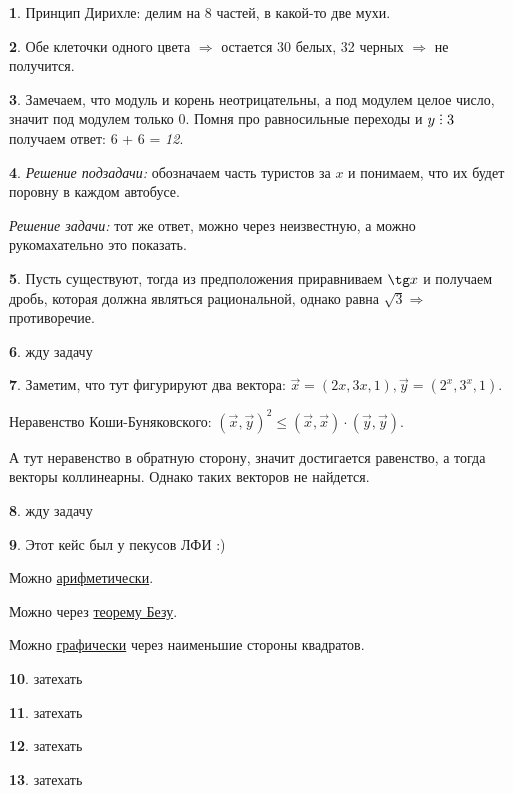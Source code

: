 \documentclass[14pt, a4paper]{extarticle}
\theoremstyle{definition}
\newtheorem{problem}{}
\theoremstyle{definition}
\theoremstyle{remark}
\numberwithin{equation}{section}
\DeclareRobustCommand{\divby}{%
  \mathrel{\text{\vbox{\baselineskip.65ex\lineskiplimit0pt\hbox{.}\hbox{.}\hbox{.}}}}%
}
\begin{document}
\begin{problem}
    Принцип Дирихле: делим на 8 частей, в какой-то две мухи.
\end{problem}

\begin{problem}
    Обе клеточки одного цвета $\Rightarrow$ остается 30 белых, 32 черных
    $\Rightarrow$ не получится.
\end{problem}

\begin{problem}
    Замечаем, что модуль и корень неотрицательны, а под модулем 
    целое число, значит под модулем только 0. Помня про равносильные
    переходы и $y \divby 3$ получаем ответ: 6 + 6 = \textit{12}.
\end{problem}

\begin{problem}
    \textit{Решение подзадачи:} обозначаем часть туристов за $x$ и понимаем,
    что их будет поровну в каждом автобусе.

    \textit{Решение задачи:} тот же ответ, можно через неизвестную,
    а можно рукомахательно это показать.
\end{problem}

\begin{problem}
    Пусть существуют, тогда из предположения приравниваем $\tg x$ и получаем
    дробь, которая должна являться рациональной, однако равна $\sqrt{3}
    \Rightarrow$ противоречие.
\end{problem}

\begin{problem}
    жду задачу
\end{problem}

\begin{problem}
    Заметим, что тут фигурируют два вектора: $\vec{x} = (2x, 3x, 1),
    \vec{y} = (2^x, 3^x, 1)$.

    Неравенство Коши-Буняковского: $(\vec{x}, \vec{y})^2 \leqslant
    (\vec{x}, \vec{x}) \cdot (\vec{y}, \vec{y})$.

    А тут неравенство в обратную сторону, значит достигается равенство,
    а тогда векторы коллинеарны. Однако таких векторов не найдется.
\end{problem}

\begin{problem}
    жду задачу
\end{problem}

\begin{problem}
    Этот кейс был у пекусов ЛФИ :)

    Можно \href{https://youtu.be/SSUCYC-nF6g}{арифметически}.

    Можно через \href{https://youtu.be/UdVr4Ak-E78}{теорему Безу}.

    Можно \href{https://youtu.be/-Gik7bfQxDM}{графически} через наименьшие стороны квадратов.
\end{problem}

\begin{problem}
    затехать
\end{problem}

\begin{problem}
    затехать
\end{problem}

\begin{problem}
    затехать
\end{problem}

\begin{problem}
    затехать
\end{problem}
\end{document}
